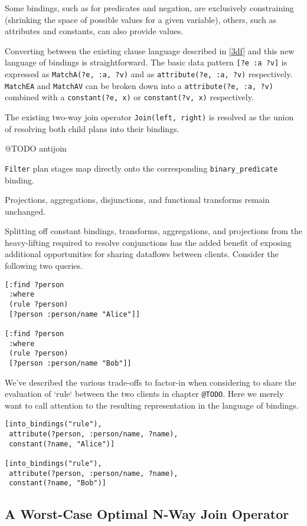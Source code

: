 \documentclass[../index.tex]{subfiles}
\begin{document}
Some bindings, such as for predicates and negation, are exclusively
constraining (shrinking the space of possible values for a given
variable), others, such as attributes and constants, can also provide
values.

Converting between the existing clause language described in \ref{3df}
and this new language of bindings is straightforward. The basic data
pattern \texttt{[?e :a ?v]} is expressed as \texttt{MatchA(?e, :a,
  ?v)} and as \texttt{attribute(?e, :a, ?v)}
respectively. \texttt{MatchEA} and \texttt{MatchAV} can be broken down
into a \texttt{attribute(?e, :a, ?v)} combined with a
\texttt{constant(?e, x)} or \texttt{constant(?v, x)} respectively.

The existing two-way join operator \texttt{Join(left, right)} is
resolved as the union of resolving both child plans into their
bindings.

@TODO antijoin

\texttt{Filter} plan stages map directly onto the corresponding
\texttt{binary\_predicate} binding.

Projections, aggregations, disjunctions, and functional transforms
remain unchanged.

Splitting off constant bindings, transforms, aggregations, and
projections from the heavy-lifting required to resolve conjunctions
has the added benefit of exposing additional opportunities for sharing
dataflows between clients. Consider the following two queries.

\begin{verbatim}
[:find ?person
 :where
 (rule ?person)
 [?person :person/name "Alice"]]

[:find ?person
 :where
 (rule ?person)
 [?person :person/name "Bob"]]
\end{verbatim}

We've described the various trade-offs to factor-in when considering
to share the evaluation of `rule` between the two clients in chapter
\texttt{@TODO}. Here we merely want to call attention to the resulting
representation in the language of bindings.

\begin{verbatim}
[into_bindings("rule"),
 attribute(?person, :person/name, ?name),
 constant(?name, "Alice")]

[into_bindings("rule"),
 attribute(?person, :person/name, ?name),
 constant(?name, "Bob")]
\end{verbatim}

\subsection{A Worst-Case Optimal N-Way Join Operator}
\end{document}

